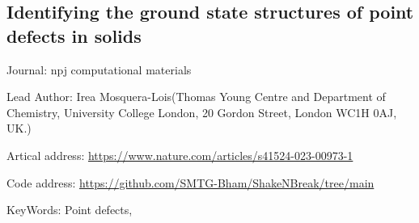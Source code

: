 \documentclass[11pt]{elegantbook}
\begin{document}
\subsection{Identifying the ground state structures of point defects in solids}
\begin{brief}
    \item Journal: npj computational materials
    \item Lead Author: Irea Mosquera-Lois(Thomas Young Centre and Department of Chemistry, University College London, 20 Gordon Street, London WC1H 0AJ, UK.)
    \item Artical address: \href{https://www.nature.com/articles/s41524-023-00973-1}{https://www.nature.com/articles/s41524-023-00973-1}
    \item Code address: \href{https://github.com/SMTG-Bham/ShakeNBreak/tree/main}{https://github.com/SMTG-Bham/ShakeNBreak/tree/main}
    \item KeyWords: Point defects, 
\end{brief}



\end{document}
